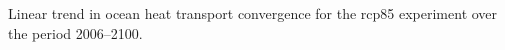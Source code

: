 \label{fig:htc}
Linear trend in ocean heat transport convergence for the rcp85 experiment over the period 2006--2100.